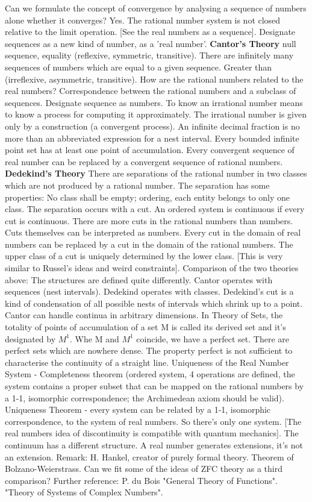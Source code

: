 \documentclass{cornell}
\begin{document}
%
{Can we formulate the concept of convergence by analysing a sequence of numbers alone whether it converges? Yes. The rational number system is not closed relative to the limit operation. [See the real numbers as a sequence]. Designate sequences as a new kind of number, as a 'real number'. \textbf{Cantor's Theory} null sequence, equality (reflexive, symmetric, transitive). There are infinitely many sequences of numbers which are equal to a given sequence. Greater than (irreflexive, asymmetric, transitive). How are the rational numbers related to the real numbers? Correspondence between the rational numbers and a subclass of sequences. Designate sequence as numbers. To know an irrational number means to know a process for computing it approximately. The irrational number is given only by a construction (a convergent process). An infinite decimal fraction is no more than an abbreviated expression for a nest interval. Every bounded infinite point set has at least one point of accumulation. Every convergent sequence of real number can be replaced by a convergent sequence of rational numbers. \textbf{Dedekind's Theory} There are separations of the rational number in two classes which are not produced by a rational number. The separation has some properties: No class shall be empty; ordering, each entity belongs to only one class. The separation occurs with a cut. An ordered system is continuous if every cut is continuous. There are more cuts in the rational numbers than numbers. Cuts themselves can be interpreted as numbers. Every cut in the domain of real numbers can be replaced by a cut in the domain of the rational numbers. The upper class of a cut is uniquely determined by the lower class. [This is very similar to Russel's ideas and weird constraints]. }%
{Comparison of the two theories above: The structures are defined quite differently. Cantor operates with sequences (nest intervals). Dedekind operates with classes. Dedekind's cut is a kind of condensation of all possible nests of intervals which shrink up to a point. Cantor can handle continua in arbitrary dimensions. In Theory of Sets, the totality of points of accumulation of a set M is called its derived set and it's designated by \( M^1 \). Whe M and \( M^1 \) coincide, we have a perfect set. There are perfect sets which are nowhere dense. The property perfect is not sufficient to characterise the continuity of a straight line. }%
{Uniqueness of the Real Number System - Completeness theorem (ordered system, 4 operations are defined, the system contains a proper subset that can be mapped on the rational numbers by a 1-1, isomorphic correspondence; the Archimedean axiom should be valid). Uniqueness Theorem - every system can be related by a 1-1, isomorphic correspondence, to the system of real numbers. So there's only one system. [The real numbers idea of discontinuity is compatible with quantum mechanics]. The continuum has a different structure. A real number generates extensions, it's not an extension. }%
{Remark: H. Hankel, creator of purely formal theory. Theorem of Bolzano-Weierstrass. Can we fit some of the ideas of ZFC theory as a third comparison? }%
{Further reference: P. du Bois "General Theory of Functions". "Theory of Systems of Complex Numbers".}%
\end{document}
